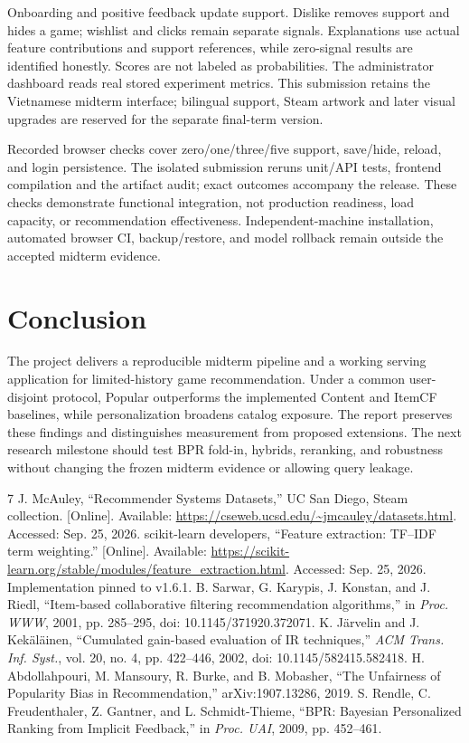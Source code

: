 \documentclass[conference,a4paper]{IEEEtran}
\begin{document}
Onboarding and positive feedback update support. Dislike removes support and hides a game; wishlist and clicks remain separate signals. Explanations use actual feature contributions and support references, while zero-signal results are identified honestly. Scores are not labeled as probabilities. The administrator dashboard reads real stored experiment metrics. This submission retains the Vietnamese midterm interface; bilingual support, Steam artwork and later visual upgrades are reserved for the separate final-term version.

Recorded browser checks cover zero/one/three/five support, save/hide, reload, and login persistence. The isolated submission reruns unit/API tests, frontend compilation and the artifact audit; exact outcomes accompany the release. These checks demonstrate functional integration, not production readiness, load capacity, or recommendation effectiveness. Independent-machine installation, automated browser CI, backup/restore, and model rollback remain outside the accepted midterm evidence.

\section{Conclusion}
The project delivers a reproducible midterm pipeline and a working serving application for limited-history game recommendation. Under a common user-disjoint protocol, Popular outperforms the implemented Content and ItemCF baselines, while personalization broadens catalog exposure. The report preserves these findings and distinguishes measurement from proposed extensions. The next research milestone should test BPR fold-in, hybrids, reranking, and robustness without changing the frozen midterm evidence or allowing query leakage.

\begin{thebibliography}{7}
 J. McAuley, ``Recommender Systems Datasets,'' UC San Diego, Steam collection. [Online]. Available: \url{https://cseweb.ucsd.edu/~jmcauley/datasets.html}. Accessed: Sep. 25, 2026.
 scikit-learn developers, ``Feature extraction: TF--IDF term weighting.'' [Online]. Available: \url{https://scikit-learn.org/stable/modules/feature_extraction.html}. Accessed: Sep. 25, 2026. Implementation pinned to v1.6.1.
 B. Sarwar, G. Karypis, J. Konstan, and J. Riedl, ``Item-based collaborative filtering recommendation algorithms,'' in \emph{Proc. WWW}, 2001, pp. 285--295, doi: 10.1145/371920.372071.
 K. Järvelin and J. Kekäläinen, ``Cumulated gain-based evaluation of IR techniques,'' \emph{ACM Trans. Inf. Syst.}, vol. 20, no. 4, pp. 422--446, 2002, doi: 10.1145/582415.582418.
 H. Abdollahpouri, M. Mansoury, R. Burke, and B. Mobasher, ``The Unfairness of Popularity Bias in Recommendation,'' arXiv:1907.13286, 2019.
 S. Rendle, C. Freudenthaler, Z. Gantner, and L. Schmidt-Thieme, ``BPR: Bayesian Personalized Ranking from Implicit Feedback,'' in \emph{Proc. UAI}, 2009, pp. 452--461.
\end{thebibliography}
\end{document}
